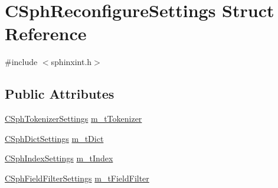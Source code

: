 \hypertarget{structCSphReconfigureSettings}{\section{C\-Sph\-Reconfigure\-Settings Struct Reference}
\label{structCSphReconfigureSettings}
}


{\ttfamily \#include $<$sphinxint.\-h$>$}

\subsection*{Public Attributes}
\begin{DoxyCompactItemize}
\item 
\hyperlink{structCSphTokenizerSettings}{C\-Sph\-Tokenizer\-Settings} \hyperlink{structCSphReconfigureSettings_aa868c55b1fd03543bcce7242e81982f9}{m\-\_\-t\-Tokenizer}
\item 
\hyperlink{structCSphDictSettings}{C\-Sph\-Dict\-Settings} \hyperlink{structCSphReconfigureSettings_a40f47cd7d52afd6f313c79d8aea17ba6}{m\-\_\-t\-Dict}
\item 
\hyperlink{structCSphIndexSettings}{C\-Sph\-Index\-Settings} \hyperlink{structCSphReconfigureSettings_af0aff159ed802db28d7ef4397c12dd7d}{m\-\_\-t\-Index}
\item 
\hyperlink{structCSphFieldFilterSettings}{C\-Sph\-Field\-Filter\-Settings} \hyperlink{structCSphReconfigureSettings_ad9f3ec1becdaad2cc1f3a8f513bd2748}{m\-\_\-t\-Field\-Filter}
\end{DoxyCompactItemize}


